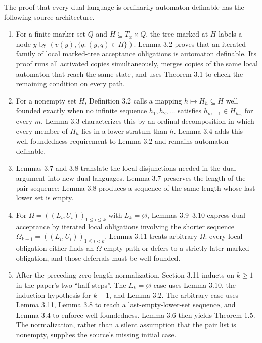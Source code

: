 The proof that every dual language is ordinarily automaton definable has the
following source architecture.

\begin{enumerate}
\item For a finite marker set \(Q\) and
  \(H\subseteq T_x\times Q\), the tree marked at \(H\) labels a node \(y\) by
  \((v(y),\{q:(y,q)\in H\})\).  Lemma 3.2 proves that an iterated family of
  local marked-tree acceptance obligations is automaton definable.  Its proof
  runs all activated copies simultaneously, merges copies of the same local
  automaton that reach the same state, and uses Theorem 3.1 to check the
  remaining condition on every path.

\item For a nonempty set \(H\), Definition 3.2 calls a mapping
  \(h\mapsto H_h\subseteq H\) well founded exactly when no infinite sequence
  \(h_1,h_2,\ldots\) satisfies
  \(h_{m+1}\in H_{h_m}\) for every \(m\).  Lemma 3.3 characterizes this by an
  ordinal decomposition in which every member of \(H_h\) lies in a lower
  stratum than \(h\).  Lemma 3.4 adds this well-foundedness requirement to
  Lemma 3.2 and remains automaton definable.

\item Lemmas 3.7 and 3.8 translate the local disjunctions needed in the dual
  argument into new dual languages.  Lemma 3.7 preserves the length of the
  pair sequence; Lemma 3.8 produces a sequence of the same length whose last
  lower set is empty.

\item For
  \(\Omega=((L_i,U_i))_{1\leq i\leq k}\) with \(L_k=\varnothing\), Lemmas
  3.9--3.10 express dual acceptance by iterated local obligations involving
  the shorter sequence
  \(\Omega_{k-1}=((L_i,U_i))_{1\leq i<k}\).  Lemma 3.11 treats arbitrary
  \(\Omega\): every local obligation either finds an \(\Omega\)-empty path or
  defers to a strictly later marked obligation, and those deferrals must be
  well founded.

\item After the preceding zero-length normalization, Section 3.11 inducts on
  \(k\geq1\) in the paper's two
  \enquote{half-steps}.  The \(L_k=\varnothing\) case uses Lemma 3.10, the
  induction hypothesis for \(k-1\), and Lemma 3.2.  The arbitrary case uses
  Lemma 3.11, Lemma 3.8 to reach a last-empty-lower-set sequence, and Lemma
  3.4 to enforce well-foundedness.  Lemma 3.6 then yields Theorem 1.5.  The
  normalization, rather than a silent assumption that the pair list is
  nonempty, supplies the source's missing initial case.
\end{enumerate}

